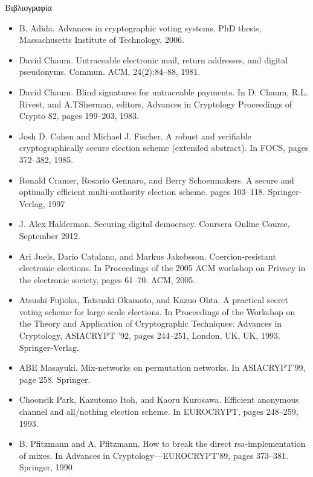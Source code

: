 \documentclass[handout]{beamer}
\begin{document}
\begin{frame}[allowframebreaks]{Βιβλιογραφία}
\begin{tiny}
\begin{itemize}
 \item B. Adida. Advances in cryptographic voting systems. PhD thesis, Massachusetts Institute of Technology, 2006.
 \item David Chaum. Untraceable electronic mail, return addresses, and digital pseudonyms. Commun. ACM, 24(2):84--88, 1981.
 \item David Chaum. Blind signatures for untraceable payments. In D. Chaum, R.L. Rivest, and A.TSherman, editors, Advances in Cryptology Proceedings of Crypto 82, pages 199--203, 1983.
 \item Josh D. Cohen and Michael J. Fischer. A robust and verifiable cryptographically secure election scheme (extended abstract). In FOCS, pages 372--382, 1985.
 \item Ronald Cramer, Rosario Gennaro, and Berry Schoenmakers. A secure and optimally efficient multi-authority election scheme. pages 103--118. Springer-Verlag, 1997
 \item J. Alex Halderman. Securing digital democracy. Coursera Online Course, September 2012.
 \item Ari Juels, Dario Catalano, and Markus Jakobsson. Coercion-resistant electronic elections. In Proceedings of the 2005 ACM workshop on Privacy in the electronic society, pages 61--70.
ACM, 2005. 
 \item Atsushi Fujioka, Tatsuaki Okamoto, and Kazuo Ohta. A practical secret voting scheme for large
scale elections. In Proceedings of the Workshop on the Theory and Application of Cryptographic
Techniques: Advances in Cryptology, ASIACRYPT '92, pages 244--251, London, UK, UK,
1993. Springer-Verlag.
 \item ABE Masayuki. Mix-networks on permutation networks. In ASIACRYPT’99, page 258. Springer.
 \item Choonsik Park, Kazutomo Itoh, and Kaoru Kurosawa. Efficient anonymous channel and all/nothing election scheme. In EUROCRYPT, pages 248--259, 1993.
  \item B. Pfitzmann and A. Pfitzmann. How to break the direct rsa-implementation of mixes. In Advances in Cryptology—EUROCRYPT’89, pages 373--381. Springer, 1990
\end{itemize} 
\end{tiny}
\end{frame}
\end{document}
